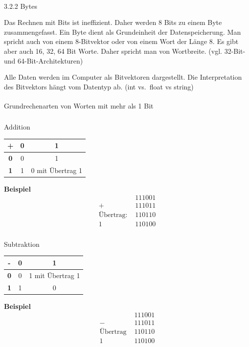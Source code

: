 \documentclass[
  11pt,
  a4paper,
  DIV=11,
  numbers=noendperiod]{scrartcl}
\makeatletter
\let\oldparagraph\paragraph
\renewcommand{\paragraph}{
    \@ifstar
      \xxxParagraphStar
      \xxxParagraphNoStar
  }
\newcommand{\xxxParagraphStar}[1]{\oldparagraph*{#1}\mbox{}}
\newcommand{\xxxParagraphNoStar}[1]{\oldparagraph{#1}\mbox{}}
\let\oldsubparagraph\subparagraph
\renewcommand{\subparagraph}{
    \@ifstar
      \xxxSubParagraphStar
      \xxxSubParagraphNoStar
  }
\newcommand{\xxxSubParagraphStar}[1]{\oldsubparagraph*{#1}\mbox{}}
\newcommand{\xxxSubParagraphNoStar}[1]{\oldsubparagraph{#1}\mbox{}}
\makeatother
\begin{document}
\paragraph{3.2.2 Bytes}\label{bytes}

Das Rechnen mit Bits ist ineffizient. Daher werden 8 Bits zu einem Byte
zusammengefasst. Ein Byte dient als Grundeinheit der Datenspeicherung.
Man spricht auch von einem 8-Bitvektor oder von einem Wort der Länge 8.
Es gibt aber auch 16, 32, 64 Bit Worte. Daher spricht man von
Wortbreite. (vgl. 32-Bit- und 64-Bit-Architekturen)

Alle Daten werden im Computer als Bitvektoren dargestellt. Die
Interpretation des Bitvektors hängt vom Datentyp ab. (int vs.~float vs
string)

\paragraph{Grundrechenarten von Worten mit mehr als 1
Bit}\label{grundrechenarten-von-worten-mit-mehr-als-1-bit}

\subparagraph{Addition}\label{addition}

\begin{longtable}[]{@{}ccc@{}}
\toprule\noalign{}
+ & 0 & 1 \\
\midrule\noalign{}
\endhead
\bottomrule\noalign{}
\endlastfoot
\textbf{0} & 0 & 1 \\
\textbf{1} & 1 & 0 mit Übertrag 1 \\
\end{longtable}

\textbf{Beispiel} \[\begin{aligned}\quad &111001\\
+&111011\\
\text{Übertrag: } &110110\\
\hline
1&110100
\end{aligned}
\]

\subparagraph{Subtraktion}\label{subtraktion}

\begin{longtable}[]{@{}ccc@{}}
\toprule\noalign{}
- & 0 & 1 \\
\midrule\noalign{}
\endhead
\bottomrule\noalign{}
\endlastfoot
\textbf{0} & 0 & 1 mit Übertrag 1 \\
\textbf{1} & 1 & 0 \\
\end{longtable}

\textbf{Beispiel} \[\begin{aligned}\quad &111001\\
-&111011\\
\text{Übertrag }&110110\\
\hline
1&110100
\end{aligned}
\]
\end{document}
